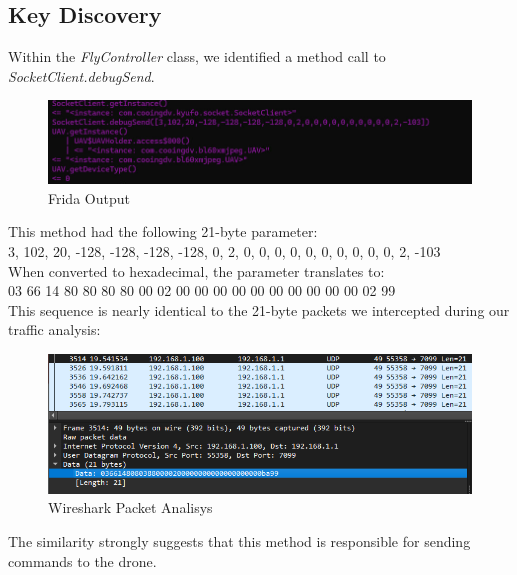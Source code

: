 \subsection*{Key Discovery}
Within the \textit{FlyController} class, we identified a method call to \textit{SocketClient.debugSend}.\\
\begin{figure}[h]
    \centering
    \includegraphics[width=.48\textwidth]{imgs/SocketClientInspect.png}
    \caption{Frida Output}
    \label{fig:name}
\end{figure}
This method had the following 21-byte parameter:\\
3, 102, 20, -128, -128, -128, -128, 0, 2, 0, 0, 0, 0, 0, 0, 0, 0, 0, 0, 2, -103\\
When converted to hexadecimal, the parameter translates to:\\
03 66 14 80 80 80 80 00 02 00 00 00 00 00 00 00 00 00 00 02 99\\
This sequence is nearly identical to the 21-byte packets we intercepted during our traffic analysis:\\
\begin{figure}[h]
    \centering
    \includegraphics[width=.48\textwidth]{imgs/Packet21B.png}
    \caption{Wireshark Packet Analisys}
    \label{fig:name}
\end{figure}
The similarity strongly suggests that this method is responsible for sending commands to the drone.
